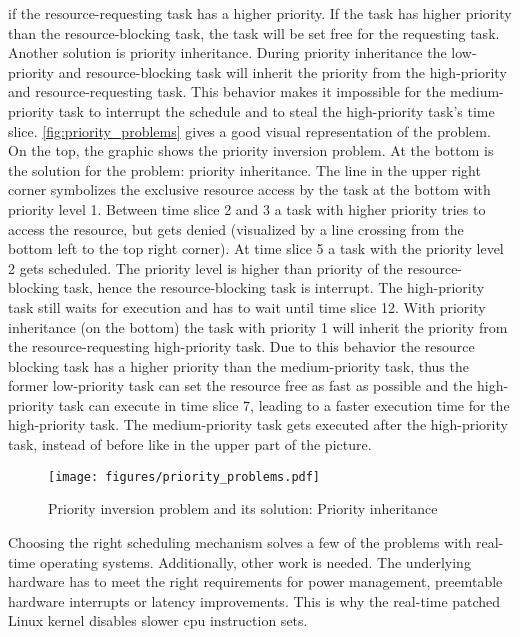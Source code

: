 \documentclass[titlepage]{report}
\begin{document}
if the resource-requesting task has a higher priority. If the task has higher priority than the resource-blocking task, the task will be set free for the requesting task. Another solution is priority inheritance.
During priority inheritance the low-priority and resource-blocking task will inherit the priority from the high-priority and resource-requesting task. This behavior makes it impossible for the medium-priority
task to interrupt the schedule and to steal the high-priority task's time slice. \autoref{fig:priority_problems} gives a good visual representation of the problem. On the top, the graphic shows the priority inversion problem.
At the bottom is the solution for the problem: priority inheritance. The line in the upper right corner symbolizes
the exclusive resource access by the task at the bottom with priority level 1. Between time slice 2 and 3 a task with higher priority tries to access the resource, but gets denied (visualized by a line crossing from the bottom left
to the top right corner). At time slice 5 a task with the priority level 2 gets scheduled. The priority level is higher than priority of the resource-blocking task, hence the resource-blocking task is interrupt. The
high-priority task still waits for execution and has to wait until time slice 12. With priority inheritance (on the bottom) the task with priority 1 will inherit the priority from the resource-requesting high-priority task.
Due to this behavior the resource blocking task has a higher priority than the medium-priority task, thus the former low-priority task can set the resource free as fast as possible and the high-priority task can execute
in time slice 7, leading to a faster execution time for the high-priority task. The medium-priority task gets executed after the high-priority task, instead of before like in the upper part of the picture.
\begin{figure}[H]
  \centering
  \texttt{[image: figures/priority\_problems.pdf]}
  \caption{Priority inversion problem and its solution: Priority inheritance\cite{Assmann}}\label{fig:priority_problems}
\end{figure}
Choosing the right scheduling mechanism solves a few of the problems with real-time operating systems. Additionally, other work is needed. The underlying hardware has to meet the right requirements for power management, preemtable hardware
interrupts or latency improvements. This is why the real-time patched Linux kernel disables slower \gls{cpu} instruction sets\cite{Assmann}. 
\end{document}
